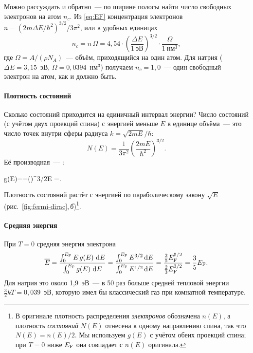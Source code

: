 Можно рассуждать и обратно~— по ширине полосы найти число свободных
электронов на атом $n_c$. Из \eqref{eq:EF} концентрация электронов
$n=(2m\Delta E/\hbar^2)^{3/2}/3\pi^2$, или в удобных единицах
\begin{equation}\label{eq:nc}
n_c=n\,\Omega=4{,}54\cdot\left(\frac{\Delta E}{1~\text{эВ}}\right)^{3/2}\cdot\frac{\Omega}{1~\text{нм}^3},
\end{equation}
где $\Omega=A/(\rho N_A)$~— объём, приходящийся на один атом. Для натрия
($\Delta E=3{,}15$~эВ, $\Omega=0{,}0394$~нм$^3$) получаем $n_c=1{,}0$~—
один свободный электрон на атом, как и должно быть.

\paragraph{Плотность состояний}
Сколько состояний приходится на единичный интервал энергии? Число
состояний (с учётом двух проекций спина) с энергией меньше $E$ в
единице объёма~— это число точек внутри сферы радиуса
$k=\sqrt{2mE}/\hbar$:
\[
N(E)=\frac{1}{3\pi^2}\left(\frac{2mE}{\hbar^2}\right)^{3/2}.
\]
Её производная~— :
\begin{keyeq}\label{eq:dos-free}
g(E)==\left(\right)^{3/2}\sqrt E
=.
\end{keyeq}
Плотность состояний растёт с энергией по параболическому закону $\sqrt
E$ (рис.~\ref{fig:fermi-dirac},\,\textit{б})\footnote{В оригинале
плотность распределения \emph{электронов} обозначена $n(E)$, а
плотность \emph{состояний} $N(E)$ отнесена к одному направлению спина,
так что $N(E)=n(E)/2$. Мы используем $g(E)$ с учётом обеих проекций
спина; при $T=0$ ниже $E_{\mathrm{F}}$ она совпадает с $n(E)$ оригинала.}.

\paragraph{Средняя энергия}
При $T=0$ средняя энергия электрона
\[
\overline E=\frac{\int_0^{E_{\mathrm{F}}}E\,g(E)\,\mathop{}\!\mathrm{d} E}{\int_0^{E_{\mathrm{F}}}g(E)\,\mathop{}\!\mathrm{d} E}
=\frac{\int_0^{E_{\mathrm{F}}}E^{3/2}\mathop{}\!\mathrm{d} E}{\int_0^{E_{\mathrm{F}}}E^{1/2}\mathop{}\!\mathrm{d} E}
=\frac{\frac25E_{\mathrm{F}}^{5/2}}{\frac23E_{\mathrm{F}}^{3/2}}=\frac35E_{\mathrm{F}} .
\]
Для натрия это около 1,9~эВ~— в 50 раз больше средней тепловой энергии
$\frac32kT=0{,}039$~эВ, которую имел бы классический газ при комнатной
температуре.

